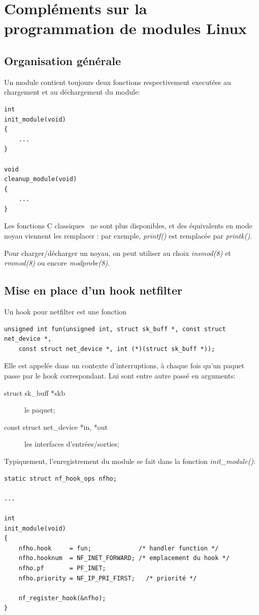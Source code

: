 \documentclass[a4paper]{article}
\begin{document}
\newpage
\appendix

\section{Compléments sur la programmation de modules Linux}
\subsection{Organisation générale}
Un module contient toujours deux fonctions respectivement executées
au chargement et au déchargement du module:
\begin{verbatim}
int
init_module(void)
{
    ...
}

void
cleanup_module(void)
{
    ...
}
\end{verbatim}

Les fonctions C \og classiques \fg\ ne sont plus disponibles, et
des équivalents en mode noyau viennent les remplacer : par exemple,
\textit{printf()} est remplacée par \textit{printk()}.

Pour charger/décharger un noyau, on peut utiliser au choix
\textit{insmod(8)} et \textit{rmmod(8)} ou encore \textit{modprobe(8)}.

\subsection{Mise en place d'un hook netfilter}
Un hook pour netfilter est une fonction
\begin{verbatim}
unsigned int fun(unsigned int, struct sk_buff *, const struct net_device *,
	const struct net_device *, int (*)(struct sk_buff *));
\end{verbatim}

Elle est appelée dans un contexte d'interruptions, à chaque
fois qu'un paquet passe par le hook correspondant. Lui sont entre
autre passé en arguments:
\begin{description}
	\item[struct sk\_buff *skb] le paquet;
	\item[const struct net\_device *in, *out] les interfaces d'entrées/sorties;
\end{description}

Typiquement, l'enregistrement du module se fait dans la fonction
\textit{init\_module()}:
\begin{verbatim}
static struct nf_hook_ops nfho;

...

int
init_module(void)
{
    nfho.hook     = fun;             /* handler function */
    nfho.hooknum  = NF_INET_FORWARD; /* emplacement du hook */
    nfho.pf       = PF_INET;
    nfho.priority = NF_IP_PRI_FIRST;   /* priorité */

    nf_register_hook(&nfho);
}
\end{verbatim}
\end{document}
